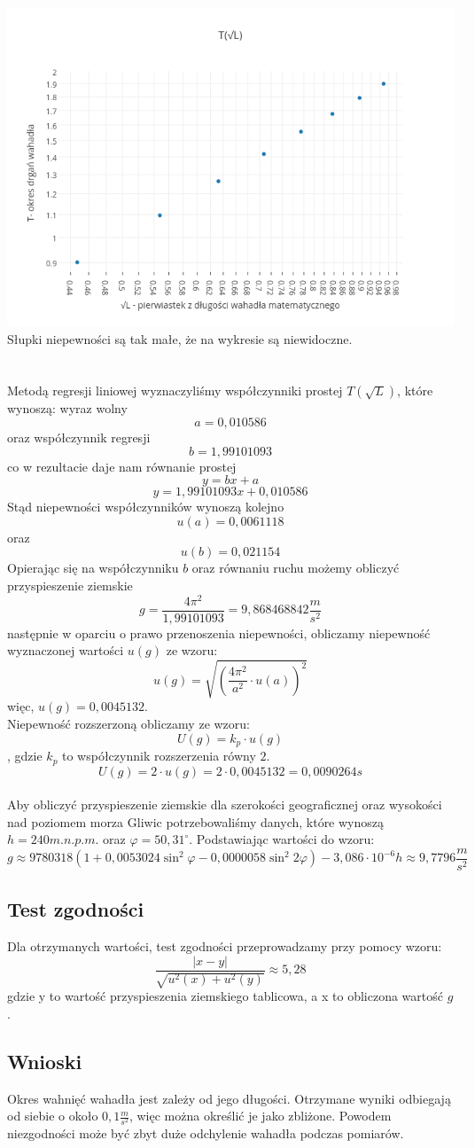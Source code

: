 \documentclass{article}
\begin{document}
\includegraphics[height=0.5\textheight]{Plot5.png}\\
Słupki niepewności są tak małe, że na wykresie są niewidoczne.\\\\\\
Metodą regresji liniowej wyznaczyliśmy współczynniki prostej $T(\sqrt{L})$, które wynoszą:                      
wyraz wolny 
$$a = 0,010586$$
oraz współczynnik regresji 
$$b = 1,99101093$$
co w rezultacie daje nam równanie prostej
$$y=bx + a$$
$$y=1,99101093x + 0,010586$$
Stąd niepewności współczynników wynoszą kolejno 
$$u(a) = 0,0061118$$
oraz 
$$u(b) = 0,021154$$
Opierając się na współczynniku $b$ oraz równaniu ruchu możemy obliczyć przyspieszenie ziemskie $$g = \frac{4\pi^2}{1,99101093} = 9,868468842 \frac{m}{s^2}$$
następnie w oparciu o prawo przenoszenia niepewności, obliczamy niepewność wyznaczonej wartości $u(g)$ ze wzoru:
$$u(g) = \sqrt{(\frac{4\pi^2}{a^2} \cdot u(a))^2}$$
więc, $u(g) = 0,0045132$.\\
Niepewność rozszerzoną obliczamy ze wzoru:
$$U(g)=k_p \cdot u(g)$$
, gdzie $k_p$ to współczynnik rozszerzenia równy $2$.
$$U(g)=2\cdot u(g)=2\cdot 0,0045132=0,0090264s$$\\



Aby obliczyć przyspieszenie ziemskie dla szerokości geograficznej oraz wysokości nad poziomem morza Gliwic potrzebowaliśmy danych, które wynoszą $h=240 m.n.p.m.$ oraz $\varphi = 50,31^{\circ}$. Podstawiając wartości do wzoru:
$$g\approx 9780318(1+0,0053024\sin^2 \varphi-0,0000058\sin^2 2\varphi ) - 3,086\cdot 10^{-6}h \approx 9,7796 \frac{m}{s^2}$$
\subsection{Test zgodności}
Dla otrzymanych wartości, test zgodności przeprowadzamy przy pomocy wzoru:
$$\frac{|x-y|}{\sqrt{u^2(x) + u^2(y)}} \approx 5,28$$
gdzie y to wartość przyspieszenia ziemskiego tablicowa, a x to obliczona wartość $g$.
\subsection{Wnioski}
Okres wahnięć wahadła jest zależy od jego długości. Otrzymane wyniki odbiegają od siebie o około $0,1\frac{m}{s^2}$, więc można określić je jako zbliżone. Powodem niezgodności może być zbyt duże odchylenie wahadła podczas pomiarów.
\end{document}
